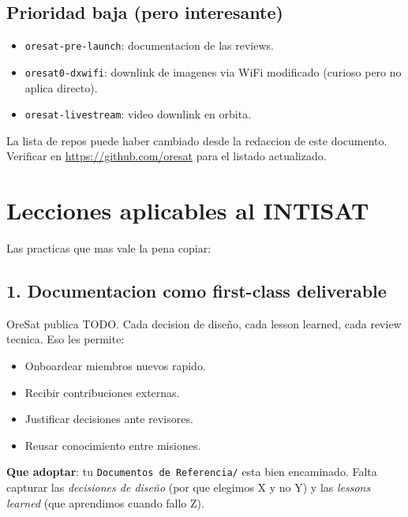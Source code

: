 \documentclass[11pt,a4paper,oneside]{report}
\begin{document}
\section{Prioridad baja (pero interesante)}

\begin{itemize}[leftmargin=2em]
  \item \texttt{oresat-pre-launch}: documentacion de las reviews.
  \item \texttt{oresat0-dxwifi}: downlink de imagenes via WiFi modificado
        (curioso pero no aplica directo).
  \item \texttt{oresat-livestream}: video downlink en orbita.
\end{itemize}

\begin{caveat}
La lista de repos puede haber cambiado desde la redaccion de este
documento. Verificar en \url{https://github.com/oresat} para el listado
actualizado.
\end{caveat}

\chapter{Lecciones aplicables al INTISAT}

Las practicas que mas vale la pena copiar:

\section{1. Documentacion como first-class deliverable}

OreSat publica TODO. Cada decision de diseño, cada lesson learned, cada
review tecnica. Eso les permite:

\begin{itemize}[leftmargin=2em]
  \item Onboardear miembros nuevos rapido.
  \item Recibir contribuciones externas.
  \item Justificar decisiones ante revisores.
  \item Reusar conocimiento entre misiones.
\end{itemize}

\textbf{Que adoptar}: tu \texttt{Documentos de Referencia/} esta bien
encaminado. Falta capturar las \emph{decisiones de diseño} (por que
elegimos X y no Y) y las \emph{lessons learned} (que aprendimos cuando
fallo Z).
\end{document}
